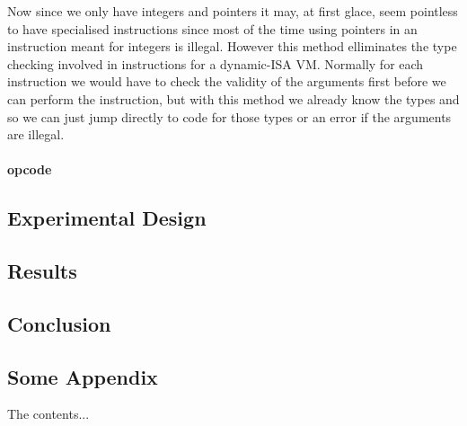 \documentclass[english,a4paper]{article}
\begin{document}
Now since we only have integers and pointers it may, at first glace,
seem pointless to have specialised instructions since most of the time
using pointers in an instruction meant for integers is
illegal. However this method elliminates the type checking involved in
instructions for a dynamic-ISA VM. Normally for each instruction we
would have to check the validity of the arguments first before we can
perform the instruction, but with this method we already know the
types and so we can just jump directly to code for those types or an
error if the arguments are illegal.



\subsubsection{opcode}

\section{Experimental Design}

\section{Results}

\section{Conclusion}

\newpage{}
\begin{appendices}
\chapter{Some Appendix}
The contents...
\end{appendices}
\end{document}
